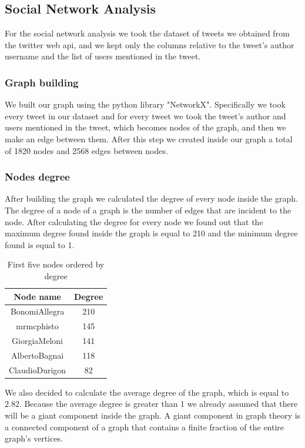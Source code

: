 \documentclass[12pt,journal,compsoc]{IEEEtran}
\begin{document}
\subsection{Social Network Analysis}
For the social network analysis we took the dataset of tweets we obtained from the twitter web api, and we kept only the columns relative to the tweet's author username and the list of users mentioned in the tweet. 
\subsubsection{Graph building}
We built our graph using the python library "NetworkX\cite{NetworkX}". Specifically we took every tweet in our dataset and for every tweet we took the tweet's author and users mentioned in the tweet, which becomes nodes of the graph, and then we make an edge between them. After this step we created inside our graph a total of 1820 nodes and 2568 edges between nodes.

\subsubsection{Nodes degree}
After building the graph we calculated the degree of every node inside the graph. The degree of a node of a graph is the number of edges that are incident to the node. After calculating the degree for every node we found out that the maximum degree found inside the graph is equal to 210 and the minimum degree found is equal to 1. 
\begin{table}[ht]
\centering
\begin{tabular}{c c }
	Node name & Degree  \\
	\hline
	BonomiAllegra & 210  \\
	mrmcphisto & 145  \\
	GiorgiaMeloni & 141  \\
	AlbertoBagnai & 118  \\
	ClaudioDurigon & 82  \\
\end{tabular}
\caption{First five nodes ordered by degree}
\end{table}
We also decided to calculate the average degree of the graph, which is equal to 2.82. Because the average degree is greater than 1 we already assumed that there will be a giant component inside the graph. A giant component in graph theory is a connected component of a graph that contains a finite fraction of the entire graph's vertices.
\end{document}
